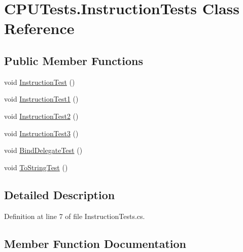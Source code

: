 \hypertarget{class_c_p_u_tests_1_1_instruction_tests}{}\section{C\+P\+U\+Tests.\+Instruction\+Tests Class Reference}
\label{class_c_p_u_tests_1_1_instruction_tests}
\subsection*{Public Member Functions}
\begin{DoxyCompactItemize}
\item 
void \hyperlink{class_c_p_u_tests_1_1_instruction_tests_a972bef1cedd4cb40a3f20a4e346e306d}{Instruction\+Test} ()
\item 
void \hyperlink{class_c_p_u_tests_1_1_instruction_tests_a9faa5af0a1c7b7617d1232c72008807d}{Instruction\+Test1} ()
\item 
void \hyperlink{class_c_p_u_tests_1_1_instruction_tests_a206c3d11cea54954ccd2d5b60a3baf1d}{Instruction\+Test2} ()
\item 
void \hyperlink{class_c_p_u_tests_1_1_instruction_tests_af074dd305c81509c67c88efa9e51b8db}{Instruction\+Test3} ()
\item 
void \hyperlink{class_c_p_u_tests_1_1_instruction_tests_a42f60f06fd34a722c85ab8c6704e91ea}{Bind\+Delegate\+Test} ()
\item 
void \hyperlink{class_c_p_u_tests_1_1_instruction_tests_abb0ee97fb38a36b2f7494aa457a27df0}{To\+String\+Test} ()
\end{DoxyCompactItemize}


\subsection{Detailed Description}


Definition at line 7 of file Instruction\+Tests.\+cs.



\subsection{Member Function Documentation}
\hypertarget{class_c_p_u_tests_1_1_instruction_tests_a42f60f06fd34a722c85ab8c6704e91ea}{}
